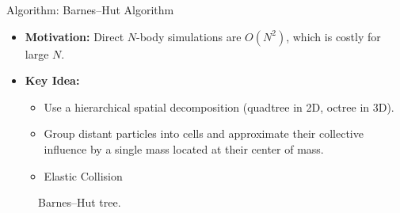 \documentclass[10pt, xcolor = svgnames, aspectratio=43]{beamer} %
\begin{document}
\begin{frame}[fragile]{Algorithm: Barnes--Hut Algorithm\cite{barnes_hierarchical_1986}}
\begin{minipage}{0.65\textwidth}
\begin{itemize}
    \item \textbf{Motivation:} Direct $N$-body simulations are $O(N^2)$, which is costly for large $N$.
    \item \textbf{Key Idea:} 
    \begin{itemize}
        \item Use a hierarchical spatial decomposition (quadtree in 2D, octree in 3D).
        \item Group distant particles into cells and approximate their collective influence by a single mass located at their center of mass.
        \item Elastic Collision
    \end{itemize}
\end{itemize}
\end{minipage}
\hspace{20pt}
\begin{minipage}{0.25\textwidth}
\begin{figure}
\caption{Barnes–Hut tree.}
\label{Barnes–Hut-tree}
\end{figure}
\end{minipage}
\end{frame}
\end{document}
